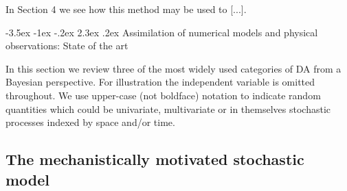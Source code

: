 \documentclass[10pt,a4paper]{article}
\makeatletter
\renewcommand\section{\@startsection{section}{1}{\z@}%
                                  {-3.5ex \@plus -1ex \@minus -.2ex}%
                                  {2.3ex \@plus.2ex}%
                                  {\normalfont\large\bfseries}}
\makeatother
\begin{document}
In Section 4 we see how this method may be used to [...].


 


\section{Assimilation of numerical models and physical observations: State of the art}

In this section we review three of the most widely used categories of DA from a Bayesian perspective. For illustration the independent variable is omitted throughout. We use upper-case (not boldface) notation to indicate random quantities which could be univariate, multivariate or in themselves stochastic processes indexed by space and/or time.

\subsection{The mechanistically motivated stochastic model}
\end{document}
